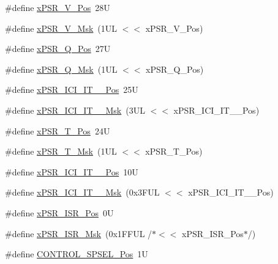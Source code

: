 \begin{DoxyCompactItemize}
\item 
\#define \hyperlink{group___c_m_s_i_s___c_o_r_e_gae0cfbb394490db402623d97e6a979e00}{x\+P\+S\+R\+\_\+\+V\+\_\+\+Pos}~28U
\item 
\#define \hyperlink{group___c_m_s_i_s___c_o_r_e_gab07f94ed3b6ee695f5af719dc27995c2}{x\+P\+S\+R\+\_\+\+V\+\_\+\+Msk}~(1\+U\+L $<$$<$ x\+P\+S\+R\+\_\+\+V\+\_\+\+Pos)
\item 
\#define \hyperlink{group___c_m_s_i_s___c_o_r_e_gaabb4178d50676a8f19cf8f727f38ace8}{x\+P\+S\+R\+\_\+\+Q\+\_\+\+Pos}~27U
\item 
\#define \hyperlink{group___c_m_s_i_s___c_o_r_e_ga133ac393c38559ae43ac36383e731dd4}{x\+P\+S\+R\+\_\+\+Q\+\_\+\+Msk}~(1\+U\+L $<$$<$ x\+P\+S\+R\+\_\+\+Q\+\_\+\+Pos)
\item 
\#define \hyperlink{group___c_m_s_i_s___c_o_r_e_gaffb36d1bb0280b1caafcf9b00f6a6da0}{x\+P\+S\+R\+\_\+\+I\+C\+I\+\_\+\+I\+T\+\_\+\_\+\+Pos}~25U
\item 
\#define \hyperlink{group___c_m_s_i_s___c_o_r_e_gaa47c89b028499f8d9ebe6d554439a2b3}{x\+P\+S\+R\+\_\+\+I\+C\+I\+\_\+\+I\+T\+\_\+\_\+\+Msk}~(3\+U\+L $<$$<$ x\+P\+S\+R\+\_\+\+I\+C\+I\+\_\+\+I\+T\+\_\+\_\+\+Pos)
\item 
\#define \hyperlink{group___c_m_s_i_s___c_o_r_e_ga98d801da9a49cda944f52aeae104dd38}{x\+P\+S\+R\+\_\+\+T\+\_\+\+Pos}~24U
\item 
\#define \hyperlink{group___c_m_s_i_s___c_o_r_e_ga30ae2111816e82d47636a8d4577eb6ee}{x\+P\+S\+R\+\_\+\+T\+\_\+\+Msk}~(1\+U\+L $<$$<$ x\+P\+S\+R\+\_\+\+T\+\_\+\+Pos)
\item 
\#define \hyperlink{group___c_m_s_i_s___c_o_r_e_gafdcd08cbd7116d65ae1a5b8182dc55ae}{x\+P\+S\+R\+\_\+\+I\+C\+I\+\_\+\+I\+T\+\_\+\_\+\+Pos}~10U
\item 
\#define \hyperlink{group___c_m_s_i_s___c_o_r_e_gae98918458d70d79b32ce200b55ffe744}{x\+P\+S\+R\+\_\+\+I\+C\+I\+\_\+\+I\+T\+\_\+\_\+\+Msk}~(0x3\+F\+U\+L $<$$<$ x\+P\+S\+R\+\_\+\+I\+C\+I\+\_\+\+I\+T\+\_\+\_\+\+Pos)
\item 
\#define \hyperlink{group___c_m_s_i_s___c_o_r_e_ga21bff245fb1aef9683f693d9d7bb2233}{x\+P\+S\+R\+\_\+\+I\+S\+R\+\_\+\+Pos}~0U
\item 
\#define \hyperlink{group___c_m_s_i_s___c_o_r_e_gadf8eed87e0081dfe1ef1c78a0ea91afd}{x\+P\+S\+R\+\_\+\+I\+S\+R\+\_\+\+Msk}~(0x1\+F\+F\+U\+L /$\ast$$<$$<$ x\+P\+S\+R\+\_\+\+I\+S\+R\+\_\+\+Pos$\ast$/)
\item 
\#define \hyperlink{group___c_m_s_i_s___c_o_r_e_ga07eafc53e609895342c6a530e9d01310}{C\+O\+N\+T\+R\+O\+L\+\_\+\+S\+P\+S\+E\+L\+\_\+\+Pos}~1U
$$
\end{DoxyCompactItemize}
